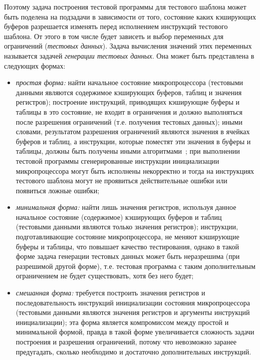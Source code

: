 Поэтому задача построения тестовой программы для тестового шаблона
может быть поделена на подзадачи в зависимости от того, состояние
каких кэширующих буферов разрешается изменять перед исполнением
инструкций тестового шаблона. От этого в том числе будет зависеть и
выбор переменных для ограничений (\emph{тестовых данных}). Задача
вычисления значений этих переменных называется задачей
\emph{генерации тестовых данных}. Она может быть представлена в
следующих формах:
\begin{itemize}
\item \emph{простая форма:} найти начальное состояние
микропроцессора (тестовыми данными являются содержимое кэширующих
буферов, таблиц и значения регистров); построение инструкций,
приводящих кэширующие буферы и таблицы в это состояние, не входит в
ограничения и должно выполняться после разрешения ограничений (т.е.
получения тестовых данных); иными словами, результатом разрешения
ограничений являются значения в ячейках буферов и таблиц, а
инструкции, которые поместят эти значения в буферы и таблицы, должны
быть получены иными алгоритмами~\cite{my_programmirovanie_2009}; при
выполнении тестовой программы сгенерированные инструкции
инициализации микропроцессора могут быть исполнены некорректно и
тогда на инструкциях тестового шаблона могут не проявиться
действительные ошибки или появиться ложные ошибки;
\item \emph{минимальная форма:} найти лишь значения регистров, используя
данное начальное состояние (содержимое) кэширующих буферов и таблиц
(тестовыми данными являются только значения регистров); инструкции,
подготавливающие состояние микропроцессора, не меняют кэширующие
буферы и таблицы, что повышает качество тестирования, однако в такой
форме задача генерации тестовых данных может быть неразрешима (при
разрешимой другой форме), т.е. тестовая программа с таким
дополнительным ограничением не будет существовать, хотя без него
будет;
\item \emph{смешанная форма:} требуется построить
значения регистров и последовательность инструкций инициализации
состояния микропроцессора (тестовыми данными являются значения
регистров и аргументы инструкций инициализации); эта форма является
компромиссом между простой и минимальной формой, правда в такой
форме увеличивается сложность задачи построения и разрешения
ограничений, потому что невозможно заранее предугадать, сколько
необходимо и достаточно дополнительных инструкций.
\end{itemize}

